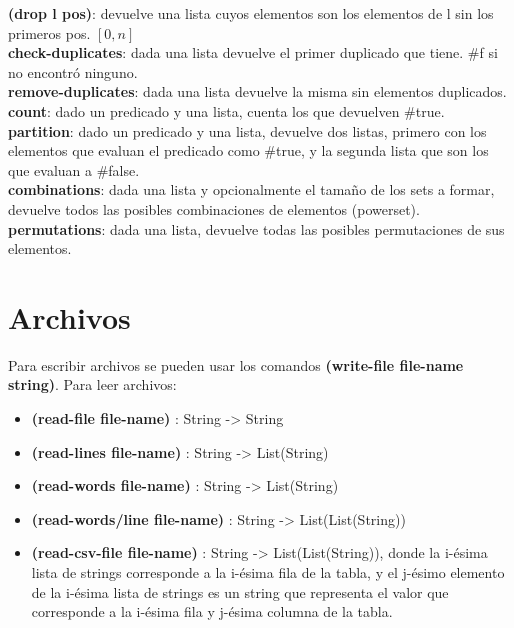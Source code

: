 \documentclass[11pt,a4paper]{article}
\begin{document}
\noindent \textbf{(drop l pos)}: devuelve una lista cuyos elementos son los elementos de l sin los primeros pos. $[0,n]$\\

\noindent \textbf{check-duplicates}: dada una lista devuelve el primer duplicado que tiene. \#f si no encontr\'o ninguno.\\

\noindent \textbf{remove-duplicates}: dada una lista devuelve la misma sin elementos duplicados.\\

\noindent \textbf{count}: dado un predicado y una lista, cuenta los que devuelven \#true.\\

\noindent \textbf{partition}: dado un predicado y una lista, devuelve dos listas, primero con los elementos que evaluan el predicado como \#true, y la segunda lista que son los que evaluan a \#false.\\

\noindent \textbf{combinations}: dada una lista y opcionalmente el tama\~no de los sets a formar, devuelve todos las posibles combinaciones de elementos (powerset).\\

\noindent \textbf{permutations}: dada una lista, devuelve todas las posibles permutaciones de sus elementos.

\section{Archivos}
Para escribir archivos se pueden usar los comandos \textbf{(write-file file-name string)}. Para leer archivos:
\begin{itemize}
\item \textbf{(read-file file-name)} : String -> String
\item \textbf{(read-lines file-name)} : String -> List(String)
\item \textbf{(read-words file-name)} : String -> List(String)
\item \textbf{(read-words/line file-name)} : String -> List(List(String))
\item \textbf{(read-csv-file file-name)} : String -> List(List(String)), donde la i-ésima lista de strings corresponde a la i-ésima fila de la tabla, y el j-ésimo elemento de la i-ésima lista de strings es un string que representa el valor que corresponde a la i-ésima fila y j-ésima columna de la tabla.
\end{itemize}
\end{document}
